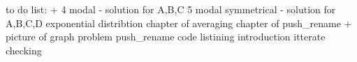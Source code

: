 to do list:
+ 4 modal - solution for A,B,C
5 modal symmetrical - solution for A,B,C,D
exponential distribtion
chapter of averaging
chapter of push_rename + picture of graph problem
push_rename code listining
introduction 
itterate checking